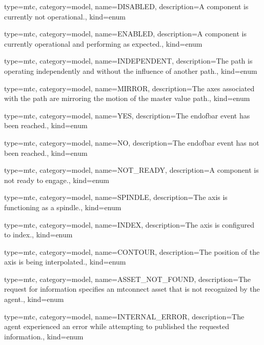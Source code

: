 {
  type=mtc,
  category=model,
  name={DISABLED},
  description={A component is currently not operational.},
  kind={enum}
}


{
  type=mtc,
  category=model,
  name={ENABLED},
  description={A component is currently operational and performing as expected.},
  kind={enum}
}


{
  type=mtc,
  category=model,
  name={INDEPENDENT},
  description={The path is operating independently and without the influence of another path.},
  kind={enum}
}


{
  type=mtc,
  category=model,
  name={MIRROR},
  description={The axes associated with the path are mirroring the motion of the \gls{master value} path.},
  kind={enum}
}


{
  type=mtc,
  category=model,
  name={YES},
  description={The \gls{endofbar event} has been reached.},
  kind={enum}
}


{
  type=mtc,
  category=model,
  name={NO},
  description={The \gls{endofbar event} has not been reached.},
  kind={enum}
}


{
  type=mtc,
  category=model,
  name={NOT\_READY},
  description={A component is not ready to engage.},
  kind={enum}
}


{
  type=mtc,
  category=model,
  name={SPINDLE},
  description={The axis is functioning as a spindle.},
  kind={enum}
}


{
  type=mtc,
  category=model,
  name={INDEX},
  description={The axis is configured to index.},
  kind={enum}
}


{
  type=mtc,
  category=model,
  name={CONTOUR},
  description={The position of the axis is being interpolated.},
  kind={enum}
}


{
  type=mtc,
  category=model,
  name={ASSET\_NOT\_FOUND},
  description={The \gls{request} for information specifies an \gls{mtconnect asset} that is not recognized by the \gls{agent}.},
  kind={enum}
}

{
  type=mtc,
  category=model,
  name={INTERNAL\_ERROR},
  description={The \gls{agent} experienced an error while attempting to published the requested information.},
  kind={enum}
}



